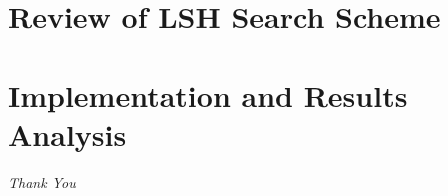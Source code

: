 \documentclass{beamer}
\begin{document}
	\section{Review of LSH Search Scheme}
	
	
	
	
	\section{Implementation and Results Analysis}
	
	\begin{frame}[allowframebreaks]
	
	\tiny
	
	\end{frame}
	
	\begin{frame}{}
  		\centering \LARGE
  		\emph{Thank You}
	\end{frame}
\end{document}
